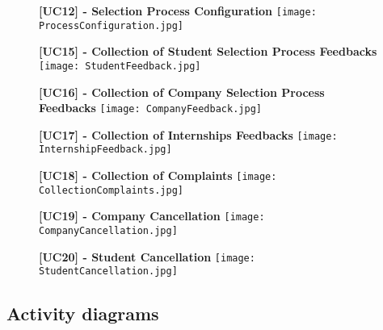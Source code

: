 			\begin{figure}[H]
				\centering
				{\bfseries [UC12] - Selection Process Configuration}
				\texttt{[image: ProcessConfiguration.jpg]}
				
			\end{figure}
			
			\begin{figure}[H]
				\centering
				{\bfseries [UC15] - Collection of Student Selection Process Feedbacks}
				\texttt{[image: StudentFeedback.jpg]}
				
			\end{figure}
			
			\begin{figure}[H]
				\centering
				{\bfseries [UC16] - Collection of Company Selection Process Feedbacks}
				\texttt{[image: CompanyFeedback.jpg]}
				
			\end{figure}
			
			\begin{figure}[H]
				\centering
				{\bfseries [UC17] - Collection of Internships Feedbacks}
				\texttt{[image: InternshipFeedback.jpg]}
				
			\end{figure}
			
			
			\begin{figure}[H]
				\centering
				{\bfseries [UC18] - Collection of Complaints}
				\texttt{[image: CollectionComplaints.jpg]}
				
			\end{figure}
			
			\begin{figure}[H]
				\centering
				{\bfseries [UC19] - Company Cancellation}
				\texttt{[image: CompanyCancellation.jpg]}
				
			\end{figure}
			
			\begin{figure}[H]
				\centering
				{\bfseries [UC20] - Student Cancellation}
				\texttt{[image: StudentCancellation.jpg]}
				
			\end{figure}
		\subsection{Activity diagrams}
